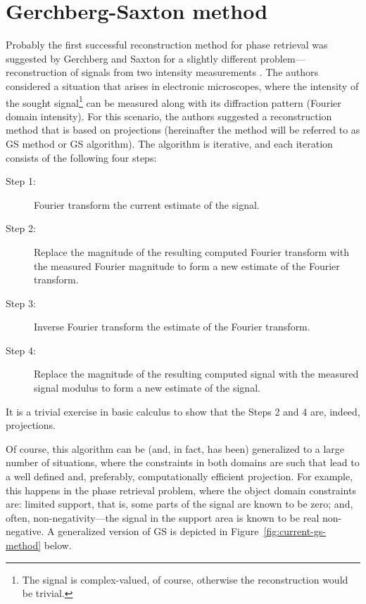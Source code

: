 \section{Gerchberg-Saxton method}
\label{sec:gerchb-saxt-meth}
Probably the first successful reconstruction method for phase
retrieval was suggested by Gerchberg and Saxton for a slightly
different problem---reconstruction of signals from two intensity
measurements .  The authors considered a
situation that arises in electronic microscopes, where the intensity of
the sought signal\footnote{The signal is complex-valued, of course,
  otherwise the reconstruction would be trivial.}  can be measured
along with its diffraction pattern (Fourier domain intensity). For
this scenario, the authors suggested a reconstruction method that is
based on projections (hereinafter the method will be referred
to as GS method or GS algorithm). The algorithm is iterative, and each
iteration consists of the following four steps:
\begin{description}
\item[Step 1:] Fourier transform the current estimate of the signal.
\item[Step 2:] Replace the magnitude of the resulting computed Fourier
  transform with the measured Fourier magnitude to form a new estimate of
  the Fourier transform.
\item[Step 3:] Inverse Fourier transform the estimate of the Fourier transform.
\item[Step 4:] Replace the magnitude of the resulting computed signal with the
  measured signal modulus to form a new estimate of the signal.
\end{description}
It is a trivial exercise in basic calculus to show that the Steps
2 and 4 are, indeed, projections.

Of course, this algorithm can be (and, in fact, has been)
generalized to a large number of situations, where  the
constraints in both domains are such that lead to a well defined and,
preferably, computationally efficient projection. For example,
this happens in the phase retrieval problem, where the object domain
constraints are: limited support, that is, some parts of the signal
are known to be zero; and, often, non-negativity---the signal in the
support area is known to be real non-negative. A generalized version
of GS is depicted in Figure~\ref{fig:current-gs-method} below.

